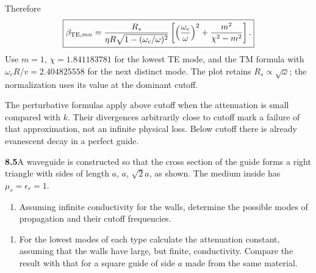 Therefore
\[
\boxed{\beta_{{\rm TE},mn}=
\frac{R_s}{\eta R\sqrt{1-(\omega_c/\omega)^2}}
\left[\left(\frac{\omega_c}{\omega}\right)^2+
\frac{m^2}{\chi^2-m^2}\right].}
\]
Use $m=1$, $\chi=1.841183781$ for the lowest TE mode, and the
TM formula with $\omega_cR/v=2.404825558$ for the next distinct
mode.  The plot retains $R_s\propto\sqrt\omega$; the normalization
uses its value at the dominant cutoff.
\begin{center}\end{center}
The perturbative formulas apply above cutoff when the attenuation is
small compared with $k$.  Their divergences arbitrarily close to
cutoff mark a failure of that approximation, not an infinite physical
loss.  Below cutoff there is already evanescent decay in a perfect guide.

\par\bigskip
\noindent\textbf{8.5}\quad A waveguide is constructed so that the cross section of the guide forms a right triangle with sides of length $a$, $a$, $\sqrt{2}a$, as shown. The medium inside has $\mu_{r}=\epsilon_{r}=1$.
\begin{enumerate}
\item[(a)] Assuming infinite conductivity for the walls, determine the possible modes of propagation and their cutoff frequencies.
\end{enumerate}

\begin{center}
\end{center}

\begin{enumerate}
\item[(b)] For the lowest modes of each type calculate the attenuation constant, assuming that the walls have large, but finite, conductivity. Compare the result with that for a square guide of side $a$ made from the same material.
\end{enumerate}
\solution

